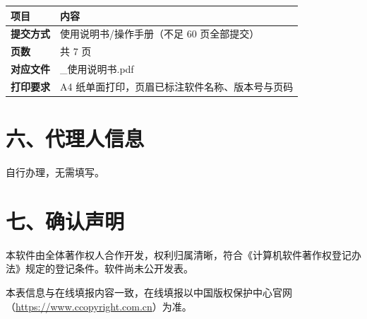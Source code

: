 \documentclass[zihao=-4,a4paper,fontset=none]{ctexart}
\begin{document}
\begin{tabular}{>{\bfseries}l>{\raggedright\arraybackslash}p{11cm}}
  \toprule
  项目 & 内容 \\
  \midrule
  提交方式 & 使用说明书/操作手册（不足 60 页全部提交） \\
  页数 & 共 7 页 \\
  对应文件 & 03\_使用说明书.pdf \\
  打印要求 & A4 纸单面打印，页眉已标注软件名称、版本号与页码 \\
  \bottomrule
\end{tabular}

\section*{六、代理人信息}
自行办理，无需填写。

\section*{七、确认声明}
本软件由全体著作权人合作开发，权利归属清晰，符合《计算机软件著作权登记办法》规定的登记条件。软件尚未公开发表。

\vfill
\begin{center}\small
本表信息与在线填报内容一致，在线填报以中国版权保护中心官网（\url{https://www.ccopyright.com.cn}）为准。
\end{center}
\end{document}
